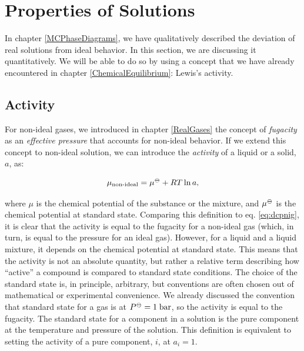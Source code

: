 \documentclass[
  9pt,
]{extbook}
\theoremstyle{definition}
\theoremstyle{definition}
\theoremstyle{definition}
\theoremstyle{remark}
\begin{document}
\renewcommand*{\standardstate}{{-\kern-6pt{\ominus}\kern-6pt-}}

\hypertarget{Solutions}{%
\chapter{Properties of Solutions}\label{Solutions}}

In chapter \ref{MCPhaseDiagrams}, we have qualitatively described the deviation of real solutions from ideal behavior. In this section, we are discussing it quantitatively. We will be able to do so by using a concept that we have already encountered in chapter \ref{ChemicalEquilibrium}: Lewis's activity.

\hypertarget{activity}{%
\section{Activity}\label{activity}}

For non-ideal gases, we introduced in chapter \ref{RealGases} the concept of \emph{fugacity} as an \emph{effective pressure} that accounts for non-ideal behavior. If we extend this concept to non-ideal solution, we can introduce the \emph{activity} of a liquid or a solid, \(a\), as:

\begin{equation}
\mu_{\text{non-ideal}} = \mu^{{-\kern-6pt{\ominus}\kern-6pt-}} + RT \ln a,
\label{eq:act1}
\end{equation}

where \(\mu\) is the chemical potential of the substance or the mixture, and \(\mu^{{-\kern-6pt{\ominus}\kern-6pt-}}\) is the chemical potential at standard state. Comparing this definition to eq. \eqref{eq:dcpnig}, it is clear that the activity is equal to the fugacity for a non-ideal gas (which, in turn, is equal to the pressure for an ideal gas). However, for a liquid and a liquid mixture, it depends on the chemical potential at standard state. This means that the activity is not an absolute quantity, but rather a relative term describing how ``active'' a compound is compared to standard state conditions. The choice of the standard state is, in principle, arbitrary, but conventions are often chosen out of mathematical or experimental convenience. We already discussed the convention that standard state for a gas is at \(P^{{-\kern-6pt{\ominus}\kern-6pt-}}=1\;\text{bar}\), so the activity is equal to the fugacity. The standard state for a component in a solution is the pure component at the temperature and pressure of the solution. This definition is equivalent to setting the activity of a pure component, \(i\), at \(a_i=1\).
\end{document}
